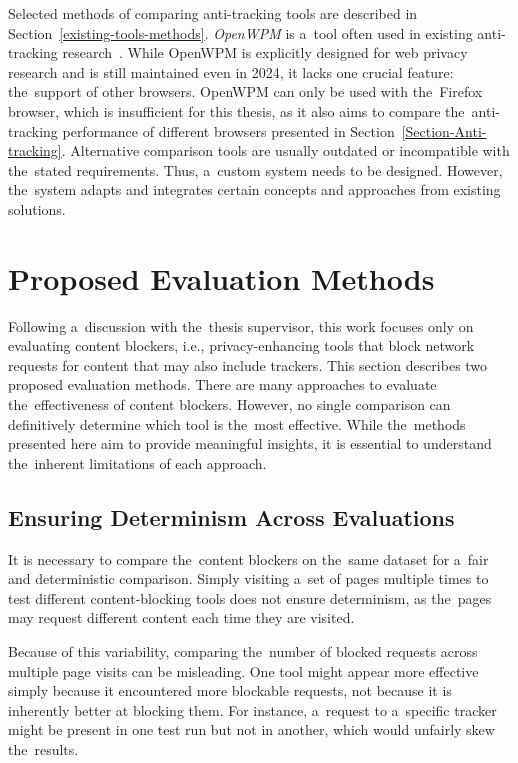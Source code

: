 Selected methods of comparing anti-tracking tools are described in Section~\ref{existing-tools-methods}. \textit{OpenWPM} is a~tool often used in existing anti-tracking research~\cite{petranova-bit, iqbal2020fingerprintingfingerprinterslearningdetect, comparison-mazel}. While OpenWPM is explicitly designed for web privacy research and is still maintained even in 2024, it lacks one crucial feature: the~support of other browsers. OpenWPM can only be used with the~Firefox browser, which is insufficient for this thesis, as it also aims to compare the~anti-tracking performance of different browsers presented in Section~\ref{Section-Anti-tracking}. Alternative comparison tools are usually outdated or incompatible with the~stated requirements. Thus, a~custom system needs to be designed. However, the~system adapts and integrates certain concepts and approaches from existing solutions.

\section{Proposed Evaluation Methods}
\label{comparison-methods-label}

Following a~discussion with the~thesis supervisor, this work focuses only on evaluating content blockers, i.e., privacy-enhancing tools that block network requests for content that may also include trackers. This section describes two proposed evaluation methods. There are many approaches to evaluate the~effectiveness of content blockers. However, no single comparison can definitively determine which tool is the~most effective. While the~methods presented here aim to provide meaningful insights, it is essential to understand the~inherent limitations of each approach.

\subsection{Ensuring Determinism Across Evaluations}
It is necessary to compare the~content blockers on the~same dataset for a~fair and deterministic comparison. Simply visiting a~set of pages multiple times to test different content-blocking tools does not ensure determinism, as the~pages may request different content each time they are visited.

Because of this variability, comparing the~number of blocked requests across multiple page visits can be misleading. One tool might appear more effective simply because it encountered more blockable requests, not because it is inherently better at blocking them. For instance, a~request to a~specific tracker might be present in one test run but not in another, which would unfairly skew the~results.

